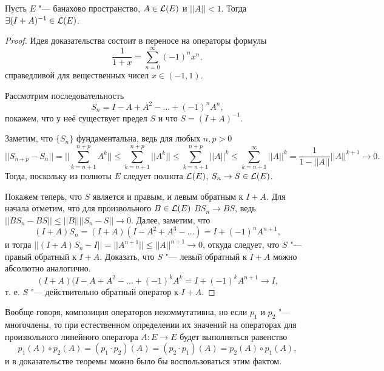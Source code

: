 \documentclass[main]{subfiles}
\begin{document}
\begin{theorem}\label{thm:inverse-neumann} %
  Пусть \( E \) "--- банахово пространство,
  \( A \in \Linears{E} \) и \( ||A|| < 1 \).
  Тогда \( \exists (I + A)^{-1} \in \Linears{E} \).
\end{theorem}
\begin{proof}
  Идея доказательства состоит
  в переносе на операторы формулы
  \[
    \frac{1}{1 + x} = \sum_{n=0}^\infty {(-1)}^n x^n,
  \]
  справедливой для вещественных чисел \( x \in (-1, 1) \).

  Рассмотрим последовательность
  \[
    S_n = I - A + A^2 - \ldots + {(-1)}^n A^n,
  \]
  покажем, что у неё существует предел \( S \)
  и что \( S = {(I + A)}^{-1} \).

  Заметим, что \( \{ S_n \} \) фундаментальна,
  ведь для любых \( n, p > 0 \)
  \[
    ||S_{n + p} - S_n|| =
    ||\sum_{k = n + 1}^{n + p} A^k|| \le
    \sum_{k = n + 1}^{n + p} ||A^k|| \le
    \sum_{k = n + 1}^{n + p} ||A||^k \le
    \sum_{k = n + 1}^{\infty} ||A||^k =
    \frac{1}{1 - ||A||} ||A||^{k+1} \to 0.
  \]
  Тогда, поскольку из полноты \( E \) следует
  полнота \( \Linears{E} \),
  \( S_n \to S \in \Linears{E} \).

  Покажем теперь, что \( S \)
  является и правым, и левым обратным к \( I + A \).
  Для начала отметим, что для произвольного
  \( B \in \Linears{E} \) \( B S_n \to B S \),
  ведь \( ||B S_n - B S|| \le ||B|| ||S_n - S|| \to 0 \).
  Далее, заметим, что
  \[
    (I + A) S_n = (I + A)(I - A^2 + A^3 - \ldots) =
    I + {(-1)}^n A^{n+1},
  \]
  и тогда \( ||(I + A) S_n - I|| = ||A^{n+1}|| \le ||A||^{n+1} \to 0 \),
  откуда следует, что \( S \) "--- правый обратный к \( I + A \).
  Доказать, что \( S \) "--- левый обратный к \( I + A \)
  можно абсолютно аналогично.
  \[ (I + A)(I - A + A^2 - \dots + (-1)^k A^k =
  I + (-1)^k A^{n + 1} \to I, \]
  т. е. \( S \) "--- действительно обратный оператор к \( I + A \).
\end{proof}
\begin{remark}
  Вообще говоря, композиция операторов
  некоммутативна,
  но если \( p_1 \) и \( p_2 \) "--- многочлены,
  то при естественном определении их значений
  на операторах для произвольного
  линейного оператора \( A : E \to E \) будет выполняться
  равенство
  \[
    p_1(A) \circ p_2(A) = (p_1 \cdot p_2)(A) =
    (p_2 \cdot p_1)(A) = p_2(A) \circ p_1(A),
  \]
  и в доказательстве теоремы можно
  было бы воспользоваться этим фактом.
\end{remark}
\end{document}

